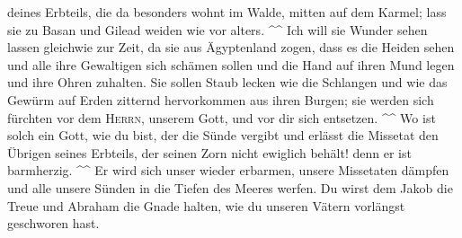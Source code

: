 deines Erbteils, die da besonders wohnt im Walde, mitten auf dem Karmel;
lass sie zu Basan und Gilead weiden wie vor alters. \^{}\^{}
 Ich will sie Wunder sehen lassen gleichwie zur Zeit, da
sie aus Ägyptenland zogen,  dass es die Heiden sehen und
alle ihre Gewaltigen sich schämen sollen und die Hand auf ihren Mund
legen und ihre Ohren zuhalten.  Sie sollen Staub lecken
wie die Schlangen und wie das Gewürm auf Erden zitternd hervorkommen aus
ihren Burgen; sie werden sich fürchten vor dem \textsc{Herrn}, unserem
Gott, und vor dir sich entsetzen. \^{}\^{}  Wo ist solch
ein Gott, wie du bist, der die Sünde vergibt und erlässt die Missetat
den Übrigen seines Erbteils, der seinen Zorn nicht ewiglich behält! denn
er ist barmherzig. \^{}\^{}  Er wird sich unser wieder
erbarmen, unsere Missetaten dämpfen und alle unsere Sünden in die Tiefen
des Meeres werfen.  Du wirst dem Jakob die Treue und
Abraham die Gnade halten, wie du unseren Vätern vorlängst geschworen
hast.

